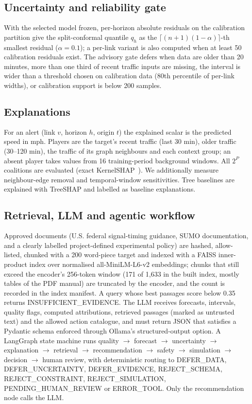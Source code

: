 \subsection{Uncertainty and reliability gate}
With the selected model frozen, per-horizon absolute residuals on the calibration partition give the split-conformal
quantile $q_h$ as the $\lceil (n+1)(1-\alpha)\rceil$-th smallest residual ($\alpha=0.1$); a per-link variant is also
computed when at least 50 calibration residuals exist. The advisory gate defers when data are older than 20 minutes,
more than one third of recent traffic inputs are missing, the interval is wider than a threshold chosen on calibration
data (80th percentile of per-link widths), or calibration support is below 200 samples.

\subsection{Explanations}
For an alert (link $v$, horizon $h$, origin $t$) the explained scalar is the predicted speed in mph. Players are the
target's recent traffic (last 30 min), older traffic (30--120 min), the traffic of its graph neighbours and each context
group; an absent player takes values from 16 training-period background windows. All $2^P$ coalitions are evaluated
(exact KernelSHAP~\cite{lundberg2017shap}). We additionally measure neighbour-edge removal and temporal-window
sensitivities. Tree baselines are explained with TreeSHAP and labelled as baseline explanations.

\subsection{Retrieval, LLM and agentic workflow}
Approved documents (U.S. federal signal-timing guidance, SUMO documentation, and a clearly labelled project-defined
experimental policy) are hashed, allow-listed, chunked with a 200 word-piece target and indexed with a FAISS
inner-product index over normalised all-MiniLM-L6-v2 embeddings; chunks that still exceed the encoder's 256-token
window (171 of 1{,}633 in the built index, mostly tables of the PDF manual) are truncated by the encoder, and the
count is recorded in the index manifest. A query whose best passages
score below 0.35 returns INSUFFICIENT\_EVIDENCE. The LLM receives forecasts, intervals, quality flags, computed
attributions, retrieved passages (marked as untrusted text) and the allowed action catalogue, and must return JSON that
satisfies a Pydantic schema enforced through Ollama's structured-output option. A LangGraph state machine runs
quality $\rightarrow$ forecast $\rightarrow$ uncertainty $\rightarrow$ explanation $\rightarrow$ retrieval
$\rightarrow$ recommendation $\rightarrow$ safety $\rightarrow$ simulation $\rightarrow$ decision $\rightarrow$ human
review, with deterministic routing to DEFER\_DATA, DEFER\_UNCERTAINTY, DEFER\_EVIDENCE, REJECT\_SCHEMA,
REJECT\_CONSTRAINT, REJECT\_SIMULATION, PENDING\_HUMAN\_REVIEW or ERROR\_TOOL. Only the recommendation node calls the
LLM.

